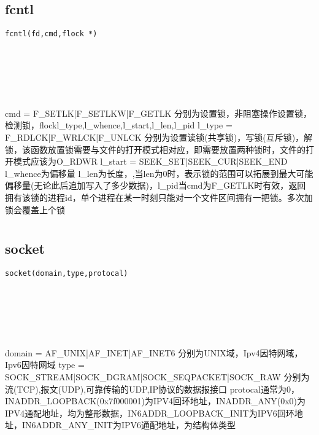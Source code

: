 \documentclass[10pt,a4paper]{article}
\begin{document}
\subsection{fcntl}
\begin{spacing}{2.0}
\lstset{language=C,numbers=none}
\begin{lstlisting}
fcntl(fd,cmd,flock *)
\end{lstlisting}
{\large\color[rgb]{0.2,0.4,0.6}{fd:}} \\
{\large\color[rgb]{0.2,0.4,0.6}{cmd:}} \\
{\large\color[rgb]{0.2,0.4,0.6}{*:}}
\paragraph{ \ \ }cmd = F\_SETLK|F\_SETLKW|F\_GETLK 分别为设置锁，非阻塞操作设置锁，检测锁，flock{l\_type,l\_whence,l\_start,l\_len,l\_pid} l\_type = F\_RDLCK|F\_WRLCK|F\_UNLCK 分别为设置读锁(共享锁)，写锁(互斥锁)，解锁，该函数放置锁需要与文件的打开模式相对应，即需要放置两种锁时，文件的打开模式应该为O\_RDWR l\_start = SEEK\_SET|SEEK\_CUR|SEEK\_END l\_whence为偏移量 l\_len为长度，,当len为0时，表示锁的范围可以拓展到最大可能偏移量(无论此后追加写入了多少数据)，l\_pid当cmd为F\_GETLK时有效，返回拥有该锁的进程id，单个进程在某一时刻只能对一个文件区间拥有一把锁。多次加锁会覆盖上个锁
\end{spacing}

\section{\color[rgb]{0.2,0.4,0.6}{套接字}}
\subsection{socket}
\begin{spacing}{2.0}
\lstset{language=C,numbers=none}
\begin{lstlisting}
socket(domain,type,protocal)
\end{lstlisting}
{\large\color[rgb]{0.2,0.4,0.6}{domain:}} \\
{\large\color[rgb]{0.2,0.4,0.6}{type:}} \\
{\large\color[rgb]{0.2,0.4,0.6}{protocal:}}
\paragraph{ \ \ }domain = AF\_UNIX|AF\_INET|AF\_INET6 分别为UNIX域，Ipv4因特网域，Ipv6因特网域 type = SOCK\_STREAM|SOCK\_DGRAM|SOCK\_SEQPACKET|SOCK\_RAW 分别为流(TCP),报文(UDP),可靠传输的UDP,IP协议的数据报接口 protocal通常为0，INADDR\_LOOPBACK(0x7f000001)为IPV4回环地址，INADDR\_ANY(0x0)为IPV4通配地址，均为整形数据，IN6ADDR\_LOOPBACK\_INIT为IPV6回环地址，IN6ADDR\_ANY\_INIT为IPV6通配地址，为结构体类型
\end{spacing}
\end{document}
